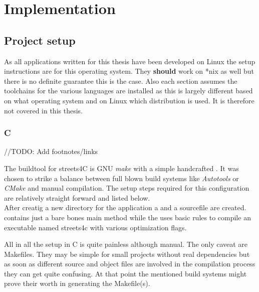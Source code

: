 \chapter{Implementation}
\label{ch:Implementation}


\setcounter{section}{-1}
\section{Project setup}
\label{sec:Implementation::Setup}

As all applications written for this thesis have been developed on Linux the setup instructions are for this operating system. They \textbf{should} work on *nix as well but there is no definite guarantee this is the case. Also each section assumes the toolchains for the various languages are installed as this is largely different based on what operating system and on Linux which distribution is used. It is therefore not covered in this thesis.

\subsection{C}
\label{subsec:Implementation::Setup::C}

//TODO: Add footnotes/links

The buildtool for streets4C is GNU \textit{make} with a simple handcrafted . It was chosen to strike a balance between full blown build systems like \textit{Autotools} or \textit{CMake} and manual compilation. The setup steps required for this configuration are relatively straight forward and listed below.
\\


After creatig a new directory for the application a  and a sourcefile are created.  contains just a bare bones main method while the  uses basic rules to compile an executable named streets4c with various optimization flags.

All in all the setup in C is quite painless although manual. The only caveat are Makefiles. They may be simple for small projects without real dependencies but as soon as different source and object files are involved in the compilation process they can get quite confusing. At that point the mentioned build systems might prove their worth in generating the Makefile(s).


